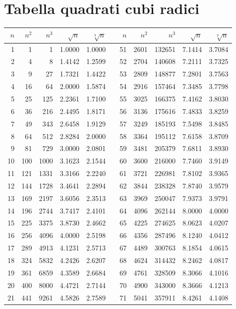 
\section{Tabella quadrati cubi radici}
\label{sec:Tabellaquadraticubiradici}
\begin{longtable}{rrrrrrrrrrr} 
	\toprule
	\bfseries $n$ &  $n^2$ & $n^3$&$\sqrt{n}$&$\sqrt[3]{n}$& &$n$ &  $n^2$ & $n^3$&$\sqrt{n}$&$\sqrt[3]{n}$  \\
	\midrule \endhead
	\bottomrule \endfoot\index{Tabella!quadrati}\index{Tabella!cubi}\index{Tabella!radici}
1&1&1&1.0000&1.0000&&51&2601&132651&7.1414&3.7084\\
2&4&8&1.4142&1.2599&&52&2704&140608&7.2111&3.7325\\
3&9&27&1.7321&1.4422&&53&2809&148877&7.2801&3.7563\\
4&16&64&2.0000&1.5874&&54&2916&157464&7.3485&3.7798\\
5&25&125&2.2361&1.7100&&55&3025&166375&7.4162&3.8030\\
6&36&216&2.4495&1.8171&&56&3136&175616&7.4833&3.8259\\
7&49&343&2.6458&1.9129&&57&3249&185193&7.5498&3.8485\\
8&64&512&2.8284&2.0000&&58&3364&195112&7.6158&3.8709\\
9&81&729&3.0000&2.0801&&59&3481&205379&7.6811&3.8930\\
10&100&1000&3.1623&2.1544&&60&3600&216000&7.7460&3.9149\\
11&121&1331&3.3166&2.2240&&61&3721&226981&7.8102&3.9365\\
12&144&1728&3.4641&2.2894&&62&3844&238328&7.8740&3.9579\\
13&169&2197&3.6056&2.3513&&63&3969&250047&7.9373&3.9791\\
14&196&2744&3.7417&2.4101&&64&4096&262144&8.0000&4.0000\\
15&225&3375&3.8730&2.4662&&65&4225&274625&8.0623&4.0207\\
16&256&4096&4.0000&2.5198&&66&4356&287496&8.1240&4.0412\\
17&289&4913&4.1231&2.5713&&67&4489&300763&8.1854&4.0615\\
18&324&5832&4.2426&2.6207&&68&4624&314432&8.2462&4.0817\\
19&361&6859&4.3589&2.6684&&69&4761&328509&8.3066&4.1016\\
20&400&8000&4.4721&2.7144&&70&4900&343000&8.3666&4.1213\\
21&441&9261&4.5826&2.7589&&71&5041&357911&8.4261&4.1408\\

\end{longtable}
